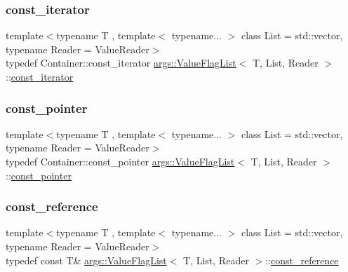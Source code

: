 \mbox{\label{classargs_1_1_value_flag_list_afc267bd3d85ff266eccf4b66cea4a274}} 
\subsubsection{\texorpdfstring{const\+\_\+iterator}{const\_iterator}}
{\footnotesize\ttfamily template$<$typename T , template$<$ typename... $>$ class List = std\+::vector, typename Reader  = Value\+Reader$>$ \\
typedef Container\+::const\+\_\+iterator \hyperlink{classargs_1_1_value_flag_list}{args\+::\+Value\+Flag\+List}$<$ T, List, Reader $>$\+::\hyperlink{classargs_1_1_value_flag_list_afc267bd3d85ff266eccf4b66cea4a274}{const\+\_\+iterator}}

\mbox{\label{classargs_1_1_value_flag_list_a891b3d1f6ee484be1c8204a7906d5c5f}} 
\subsubsection{\texorpdfstring{const\+\_\+pointer}{const\_pointer}}
{\footnotesize\ttfamily template$<$typename T , template$<$ typename... $>$ class List = std\+::vector, typename Reader  = Value\+Reader$>$ \\
typedef Container\+::const\+\_\+pointer \hyperlink{classargs_1_1_value_flag_list}{args\+::\+Value\+Flag\+List}$<$ T, List, Reader $>$\+::\hyperlink{classargs_1_1_value_flag_list_a891b3d1f6ee484be1c8204a7906d5c5f}{const\+\_\+pointer}}

\mbox{\label{classargs_1_1_value_flag_list_a49a953bd9d96f65a8e791d929ed1deeb}} 
\subsubsection{\texorpdfstring{const\+\_\+reference}{const\_reference}}
{\footnotesize\ttfamily template$<$typename T , template$<$ typename... $>$ class List = std\+::vector, typename Reader  = Value\+Reader$>$ \\
typedef const T\& \hyperlink{classargs_1_1_value_flag_list}{args\+::\+Value\+Flag\+List}$<$ T, List, Reader $>$\+::\hyperlink{classargs_1_1_value_flag_list_a49a953bd9d96f65a8e791d929ed1deeb}{const\+\_\+reference}}


